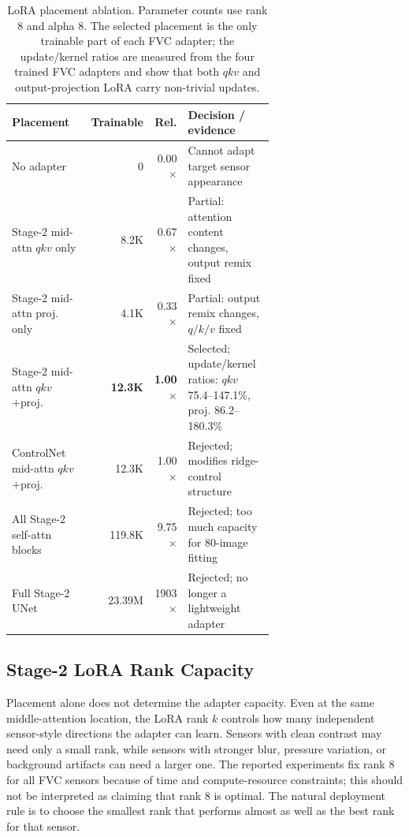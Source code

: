 \documentclass{article}
\begin{document}
\begin{table}[!htbp]
    \centering
    \footnotesize
    \caption{LoRA placement ablation.  Parameter counts use rank 8 and alpha 8.
    The selected placement is the only trainable part of each FVC adapter; the
    update/kernel ratios are measured from the four trained FVC adapters and
    show that both $qkv$ and output-projection LoRA carry non-trivial updates.}
    \label{tab:lora_placement_ablation}
    \setlength{\tabcolsep}{3.6pt}
    \renewcommand{\arraystretch}{0.95}
    \begin{tabular}{p{0.32\linewidth}rrp{0.34\linewidth}}
        \toprule
        Placement & Trainable & Rel. & Decision / evidence \\
        \midrule
        No adapter & 0 & 0.00$\times$ & Cannot adapt target sensor appearance \\
        Stage-2 mid-attn $qkv$ only & 8.2K & 0.67$\times$ & Partial: attention content changes, output remix fixed \\
        Stage-2 mid-attn proj. only & 4.1K & 0.33$\times$ & Partial: output remix changes, $q/k/v$ fixed \\
        Stage-2 mid-attn $qkv$+proj. & \textbf{12.3K} & \textbf{1.00$\times$} & Selected; update/kernel ratios: $qkv$ 75.4--147.1\%, proj. 86.2--180.3\% \\
        ControlNet mid-attn $qkv$+proj. & 12.3K & 1.00$\times$ & Rejected; modifies ridge-control structure \\
        All Stage-2 self-attn blocks & 119.8K & 9.75$\times$ & Rejected; too much capacity for 80-image fitting \\
        Full Stage-2 UNet & 23.39M & 1903$\times$ & Rejected; no longer a lightweight adapter \\
        \bottomrule
    \end{tabular}
\end{table}
\FloatBarrier

\subsection{Stage-2 LoRA Rank Capacity}
\label{subsec:lora_rank_capacity}

Placement alone does not determine the adapter capacity.  Even at the same
middle-attention location, the LoRA rank $k$ controls how many independent
sensor-style directions the adapter can learn.  Sensors with clean contrast may
need only a small rank, while sensors with stronger blur, pressure variation, or
background artifacts can need a larger one.  The reported experiments fix rank 8
for all FVC sensors because of time and compute-resource constraints; this should
not be interpreted as claiming that rank 8 is optimal.  The natural deployment
rule is to choose the smallest rank that performs almost as well as the best rank
for that sensor.
\end{document}
